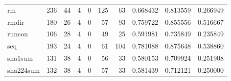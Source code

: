 \begin{tabular}{lrrrrrrrrr}
rm        &                                                236 &                                                 44 &                                                  4 &                                                  0 &                                                125 &                                                 63 &                                           0.668432 &                               0.813559 &                             0.266949 \\
rmdir     &                                                180 &                                                 26 &                                                  4 &                                                  0 &                                                 57 &                                                 93 &                                           0.759722 &                               0.855556 &                             0.516667 \\
runcon    &                                                106 &                                                 28 &                                                  4 &                                                  0 &                                                 49 &                                                 25 &                                           0.591981 &                               0.735849 &                             0.235849 \\
seq       &                                                193 &                                                 24 &                                                  4 &                                                  0 &                                                 61 &                                                104 &                                           0.781088 &                               0.875648 &                             0.538860 \\
sha1sum   &                                                131 &                                                 38 &                                                  4 &                                                  0 &                                                 56 &                                                 33 &                                           0.580153 &                               0.709924 &                             0.251908 \\
sha224sum &                                                132 &                                                 38 &                                                  4 &                                                  0 &                                                 57 &                                                 33 &                                           0.581439 &                               0.712121 &                             0.250000 \\

\end{tabular}
